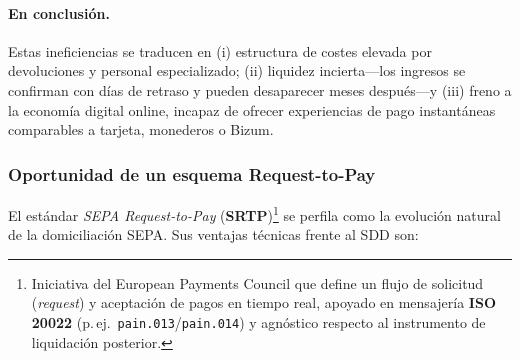 \paragraph{En conclusión.} Estas ineficiencias se traducen en (i) estructura de costes elevada por devoluciones y personal especializado; (ii) liquidez incierta—los ingresos se confirman con días de retraso y pueden desaparecer meses después—y (iii) freno a la economía digital online, incapaz de ofrecer experiencias de pago instantáneas comparables a tarjeta, monederos o Bizum.

\subsubsection{Oportunidad de un esquema Request-to-Pay}
El estándar \textit{SEPA Request-to-Pay} (\textbf{SRTP})\footnote{Iniciativa del European Payments Council que define un flujo de solicitud (\textit{request}) y aceptación de pagos en tiempo real, apoyado en mensajería \textbf{ISO 20022} (p.\,ej.\, \texttt{pain.013}/\texttt{pain.014}) y agnóstico respecto al instrumento de liquidación posterior.} se perfila como la evolución natural de la domiciliación SEPA. Sus ventajas técnicas frente al SDD son:

